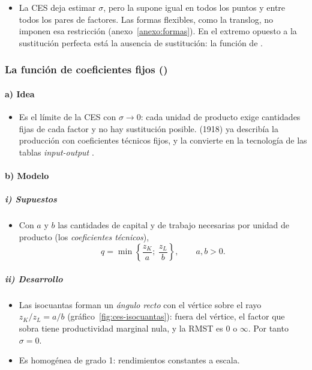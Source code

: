 \documentclass[11pt]{article}
\begin{document}
\begin{itemize}
\item La CES deja estimar $\sigma$, pero la supone igual en todos los puntos y entre todos los pares de factores. Las formas flexibles, como la translog, no imponen esa restricción (anexo~\ref{anexo:formas}). En el extremo opuesto a la sustitución perfecta está la ausencia de sustitución: la función de .
\end{itemize}

\subsubsection{La función de coeficientes fijos ()}\label{sec:funcion-coeficientes-fijos}

\paragraph{a) Idea}

\begin{itemize}
\item Es el límite de la CES con $\sigma\to 0$: cada unidad de producto exige cantidades fijas de cada factor y no hay sustitución posible.  (1918) ya describía la producción con coeficientes técnicos fijos\nocite{Humphrey1997Algebraic}, y \textcite{Leontief1936Quantitative} la convierte en la tecnología de las tablas \emph{input-output} .
\end{itemize}

\paragraph{b) Modelo}

\subparagraph{i) Supuestos}

\begin{itemize}
\item Con $a$ y $b$ las cantidades de capital y de trabajo necesarias por unidad de producto (los \emph{coeficientes técnicos}),
  \begin{equation}
  q=\min\left\{\frac{z_K}{a};\ \frac{z_L}{b}\right\},\qquad a,b>0. \label{eq:leontief}
  \end{equation}
\end{itemize}

\subparagraph{ii) Desarrollo}

\begin{itemize}
\item Las isocuantas forman un \emph{ángulo recto} con el vértice sobre el rayo $z_K/z_L=a/b$ (gráfico~\ref{fig:ces-isocuantas}): fuera del vértice, el factor que sobra tiene productividad marginal nula, y la RMST es $0$ o $\infty$. Por tanto $\sigma=0$.
\item Es homogénea de grado 1: rendimientos constantes a escala.
\end{itemize}
\end{document}
